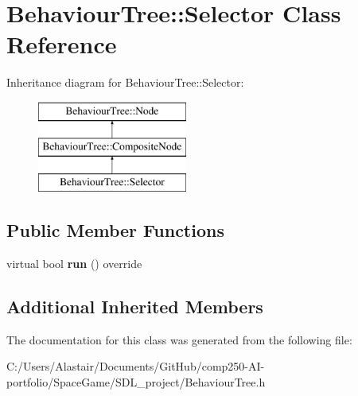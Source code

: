 \hypertarget{class_behaviour_tree_1_1_selector}{}\section{Behaviour\+Tree\+:\+:Selector Class Reference}
\label{class_behaviour_tree_1_1_selector}
Inheritance diagram for Behaviour\+Tree\+:\+:Selector\+:\begin{figure}[H]
\begin{center}
\leavevmode
\includegraphics[height=3.000000cm]{class_behaviour_tree_1_1_selector}
\end{center}
\end{figure}
\subsection*{Public Member Functions}
\begin{DoxyCompactItemize}
\item 
\mbox{\label{class_behaviour_tree_1_1_selector_ada6391d7dff66c89fb7da135bbcb2f4f}} 
virtual bool {\bfseries run} () override
\end{DoxyCompactItemize}
\subsection*{Additional Inherited Members}


The documentation for this class was generated from the following file\+:\begin{DoxyCompactItemize}
\item 
C\+:/\+Users/\+Alastair/\+Documents/\+Git\+Hub/comp250-\/\+A\+I-\/portfolio/\+Space\+Game/\+S\+D\+L\+\_\+project/Behaviour\+Tree.\+h\end{DoxyCompactItemize}

